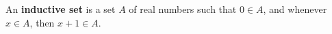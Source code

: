 An \textbf{inductive set} is a set $A$ of real numbers such that $0 \in A$, and whenever $x \in A$, then $x + 1 \in A$.
